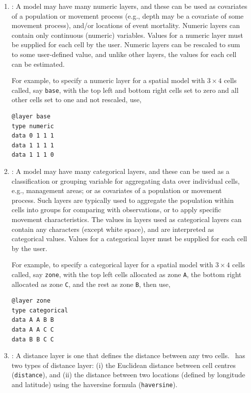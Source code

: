\begin{enumerate}
\item{\label{numeric-layer}}: A model may have many numeric layers, and these can be used as covariates of a population or movement process (e.g., depth may be a covariate of some movement process), and/or locations of event mortality. Numeric layers can contain only continuous (numeric) variables. Values for a numeric layer must be supplied for each cell by the user. Numeric layers can be rescaled to sum to some user-defined value, and unlike other layers, the values for each cell can be estimated. 

For example, to specify a numeric layer for a spatial model with $3 \times 4$ cells called, say \texttt{base}, with the top left and bottom right cells set to zero and all other cells set to one and not rescaled, use,
{\small{\begin{verbatim}
@layer base
type numeric
data 0 1 1 1
data 1 1 1 1
data 1 1 1 0
\end{verbatim}}}

\item {\label{categorical-layer}}: A model may have many categorical layers, and these can be used as a classification or grouping variable for aggregating data over individual cells, e.g., management areas; or as covariates of a population or movement process. Such layers are typically used to aggregate the population within cells into groups for comparing with observations, or to apply specific movement characteristics. The values in layers used as categorical layers can contain any characters (except white space), and are interpreted as categorical values. Values for a categorical layer must be supplied for each cell by the user.

For example, to specify a categorical layer for a spatial model with $3 \times 4$ cells called, say \texttt{zone}, with the top left cells allocated as zone \texttt{A}, the bottom right allocated as zone \texttt{C}, and the rest as zone \texttt{B}, then use,
{\small{\begin{verbatim}
@layer zone
type categorical
data A A B B
data A A C C
data B B C C
\end{verbatim}}}

\item {}: A distance layer is one that defines the distance between any two cells. \SPM\ has two types of distance layer: (i) the Euclidean distance between cell centres (\texttt{distance}), and (ii) the distance between two locations (defined by longitude and latitude) using the haversine formula (\texttt{haversine}). 


\end{enumerate}
